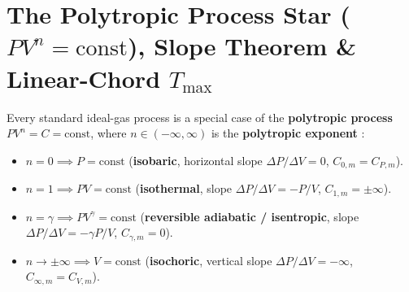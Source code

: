 \section{The Polytropic Process Star ($PV^n = \mathrm{const}$), Slope Theorem \& Linear-Chord $T_{\max}$}\label{sec:07.4}

Every standard ideal-gas process is a special case of the \textbf{polytropic process} $P V^n = C = \mathrm{const}$, where $n \in (-\infty, \infty)$ is the \textbf{polytropic exponent} :
\begin{itemize}
  \item $n = 0 \implies P = \mathrm{const}$ (\textbf{isobaric}, horizontal slope $\Delta P/\Delta V = 0$, $C_{0,m} = C_{P,m}$).
  \item $n = 1 \implies PV = \mathrm{const}$ (\textbf{isothermal}, slope $\Delta P/\Delta V = -P/V$, $C_{1,m} = \pm\infty$).
  \item $n = \gamma \implies PV^\gamma = \mathrm{const}$ (\textbf{reversible adiabatic / isentropic}, slope $\Delta P/\Delta V = -\gamma P/V$, $C_{\gamma,m} = 0$).
  \item $n \to \pm\infty \implies V = \mathrm{const}$ (\textbf{isochoric}, vertical slope $\Delta P/\Delta V = -\infty$, $C_{\infty,m} = C_{V,m}$).
\end{itemize}

